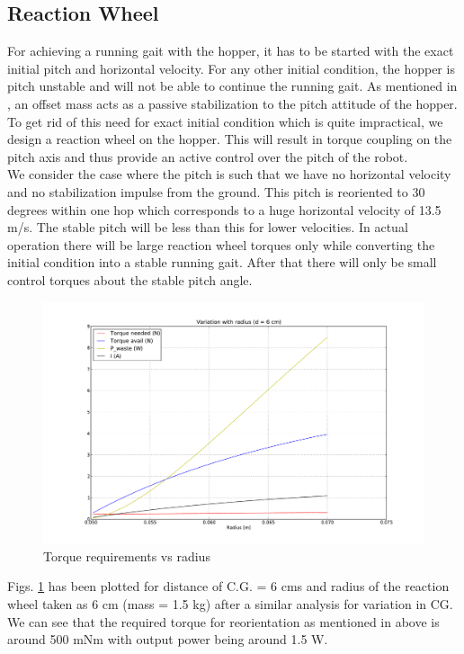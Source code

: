 \subsection*{Reaction Wheel}
For achieving a running gait with the hopper, it has to be started with the exact initial pitch and 
horizontal velocity. For any other initial condition, the hopper is pitch unstable and will not be able to 
continue the running gait. As mentioned in \cite{shanmug}, an offset mass acts as a passive stabilization 
to the pitch attitude of the hopper. To get rid of this need for exact initial condition which is quite 
impractical, we design a reaction wheel on the hopper. This will result in torque coupling on the pitch 
axis and thus provide an active control over the pitch of the robot.\\

We consider the case where the pitch is such that we have no horizontal velocity and no stabilization impulse from the ground. This pitch is reoriented to 30 degrees within one hop which corresponds to a huge horizontal velocity of 13.5 m/s. The stable pitch will be less than this for lower velocities. In actual operation
there will be large reaction wheel torques only while converting the initial condition into a stable
running gait. After that there will only be small control torques about the stable pitch angle.
\begin{figure}[!h]
\centering
\includegraphics[scale=0.4]{fig/rewac_radius.pdf}
\caption{Torque requirements vs radius}
\label{fig:3_rewac_torque}
\end{figure}
Figs. \ref{fig:3_rewac_torque} has been plotted for distance of C.G. = 6 cms and radius of the reaction wheel taken as 6 cm (mass = 1.5 kg) after a similar analysis for variation in CG. We can see that the required torque for reorientation as mentioned in above is around 500 mNm with output power being around 1.5 W.

